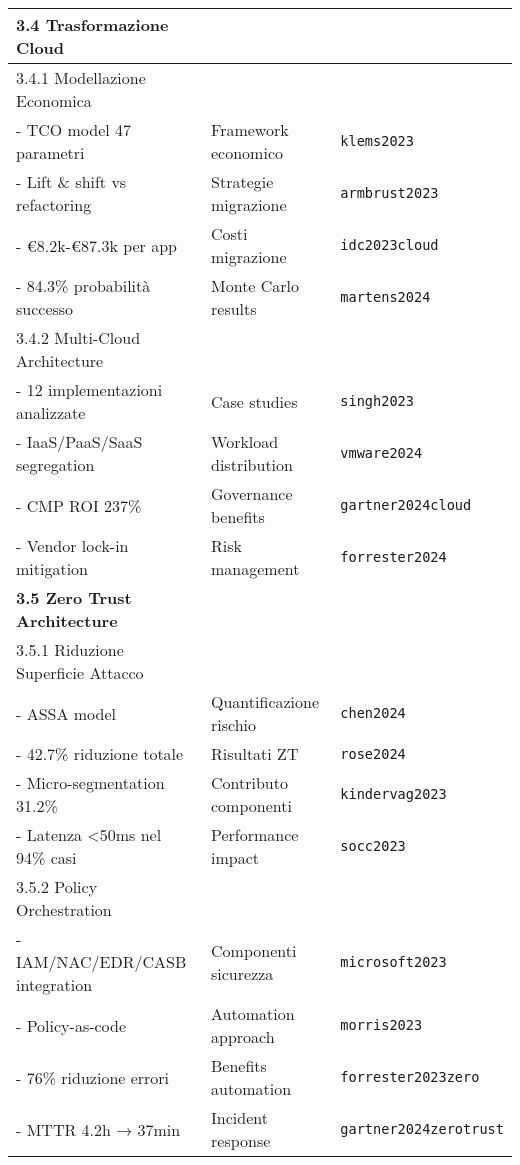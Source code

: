 \documentclass{article}
\begin{document}
\begin{longtable}{p{}|p{}|p{}}
\textbf{3.4 Trasformazione Cloud} & & \\
\midrule
3.4.1 Modellazione Economica & & \\
- TCO model 47 parametri & Framework economico & \texttt{klems2023} \\
- Lift \& shift vs refactoring & Strategie migrazione & \texttt{armbrust2023} \\
- €8.2k-€87.3k per app & Costi migrazione & \texttt{idc2023cloud} \\
- 84.3\% probabilità successo & Monte Carlo results & \texttt{martens2024} \\
\midrule
3.4.2 Multi-Cloud Architecture & & \\
- 12 implementazioni analizzate & Case studies & \texttt{singh2023} \\
- IaaS/PaaS/SaaS segregation & Workload distribution & \texttt{vmware2024} \\
- CMP ROI 237\% & Governance benefits & \texttt{gartner2024cloud} \\
- Vendor lock-in mitigation & Risk management & \texttt{forrester2024} \\
\midrule

\textbf{3.5 Zero Trust Architecture} & & \\
\midrule
3.5.1 Riduzione Superficie Attacco & & \\
- ASSA model & Quantificazione rischio & \texttt{chen2024} \\
- 42.7\% riduzione totale & Risultati ZT & \texttt{rose2024} \\
- Micro-segmentation 31.2\% & Contributo componenti & \texttt{kindervag2023} \\
- Latenza <50ms nel 94\% casi & Performance impact & \texttt{socc2023} \\
\midrule
3.5.2 Policy Orchestration & & \\
- IAM/NAC/EDR/CASB integration & Componenti sicurezza & \texttt{microsoft2023} \\
- Policy-as-code & Automation approach & \texttt{morris2023} \\
- 76\% riduzione errori & Benefits automation & \texttt{forrester2023zero} \\
- MTTR 4.2h → 37min & Incident response & \texttt{gartner2024zerotrust} \\
\midrule


\end{longtable}
\end{document}
